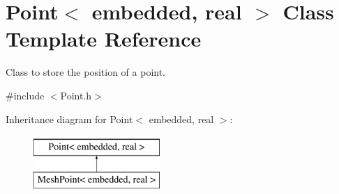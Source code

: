 \hypertarget{class_point}{}\section{Point$<$ embedded, real $>$ Class Template Reference}
\label{class_point}


Class to store the position of a point.  




{\ttfamily \#include $<$Point.\+h$>$}

Inheritance diagram for Point$<$ embedded, real $>$\+:\begin{figure}[H]
\begin{center}
\leavevmode
\includegraphics[height=2.000000cm]{class_point}
\end{center}
\end{figure}
